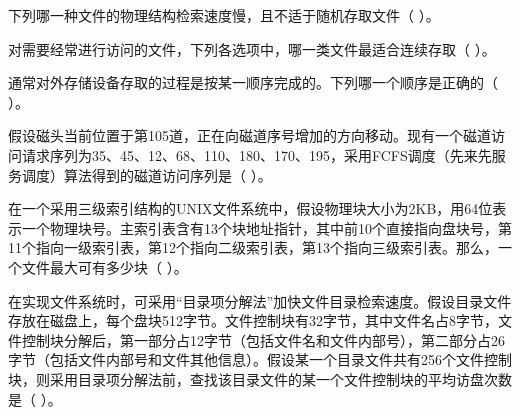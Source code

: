 \begin{qitems}[startnum=1]
\begin{bbox}
\qitem 下列哪一种文件的物理结构检索速度慢，且不适于随机存取文件（ ）。\par
{}
\end{bbox}

\begin{bbox}
\qitem 对需要经常进行访问的文件，下列各选项中，哪一类文件最适合连续存取（ ）。\par
{}
\end{bbox}

\begin{bbox}
\qitem 通常对外存储设备存取的过程是按某一顺序完成的。下列哪一个顺序是正确的（ ）。\par
{}
\end{bbox}

\begin{bbox}
\qitem 假设磁头当前位置于第105道，正在向磁道序号增加的方向移动。现有一个磁道访问请求序列为35、45、12、68、110、180、170、195，采用FCFS调度（先来先服务调度）算法得到的磁道访问序列是（ ）。\par
{}
\end{bbox}

\begin{bbox}
\qitem 在一个采用三级索引结构的UNIX文件系统中，假设物理块大小为2KB，用64位表示一个物理块号。主索引表含有13个块地址指针，其中前10个直接指向盘块号，第11个指向一级索引表，第12个指向二级索引表，第13个指向三级索引表。那么，一个文件最大可有多少块（ ）。\par
{}
\end{bbox}

\begin{bbox}
\qitem 在实现文件系统时，可采用“目录项分解法”加快文件目录检索速度。假设目录文件存放在磁盘上，每个盘块512字节。文件控制块有32字节，其中文件名占8字节，文件控制块分解后，第一部分占12字节（包括文件名和文件内部号），第二部分占26字节（包括文件内部号和文件其他信息）。假设某一个目录文件共有256个文件控制块，则采用目录项分解法前，查找该目录文件的某一个文件控制块的平均访盘次数是（ ）。\par
{}
\end{bbox}


\end{qitems}
